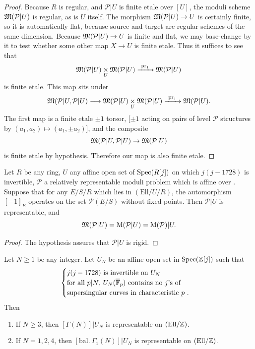 \begin{proof}
Because $R$ is regular, and $\mathcal{P}|U$ is finite etale over $[U]$, the moduli scheme $\mathfrak{M}(\mathcal{P}|U)$ is regular, as is $U$ itself. The morphism $\mathfrak{M}(\mathcal{P}|U) \to U$ is certainly finite, so it is automatically flat, because source and target are regular schemes of the same dimension. Because $\mathfrak{M}(\mathcal{P}|U) \to U$ is finite and flat, we may base-change by it to test whether some other map $X \to U$ is finite etale. Thus it suffices to see that
\[
\mathfrak{M}(\mathcal{P}|U) \underset{U}{\times} \mathfrak{M}(\mathcal{P}|U) \xrightarrow{\ \mathrm{pr}_1\ } \mathfrak{M}(\mathcal{P}|U)
\]
is finite etale. This map sits under
\[
\mathfrak{M}(\mathcal{P}|U, \mathcal{P}|U) \longrightarrow \mathfrak{M}(\mathcal{P}|U) \underset{U}{\times} \mathfrak{M}(\mathcal{P}|U) \xrightarrow{\ \mathrm{pr}_1\ } \mathfrak{M}(\mathcal{P}|U) .
\]
The first map is a finite etale $\pm 1$ torsor, [$\pm 1$ acting on pairs of level $\mathcal{P}$ structures by $(a_1, a_2) \mapsto (a_1, \pm a_2)$], and the composite
\[
\mathfrak{M}(\mathcal{P}|U, \mathcal{P}|U) \to \mathfrak{M}(\mathcal{P}|U)
\]
is finite etale by hypothesis. Therefore our map is also finite etale.
\end{proof}

\begin{kprop}\label{prop:8.4.6}
Let $R$ be any ring, $U$ any affine open set of $\operatorname{Spec}(R[j])$ on which $j(j-1728)$ is invertible, $\mathcal{P}$ a relatively representable moduli problem which is affine over \EllR. Suppose that for any $E/S/R$ which lies in $(\mathrm{Ell}/U/R)$, the automorphism $[-1]_E$ operates on the set $\mathcal{P}(E/S)$ without fixed points. Then $\mathcal{P}|U$ is representable, and
\[
\mathfrak{M}(\mathcal{P}|U) = \mathrm{M}(\mathcal{P}|U) = \mathrm{M}(\mathcal{P})|U .
\]
\end{kprop}

\begin{proof}
The hypothesis assures that $\mathcal{P}|U$ is rigid.
\end{proof}

\begin{kcor}\label{cor:8.4.7}
Let $N \ge 1$ be any integer. Let $U_N$ be an affine open set in $\operatorname{Spec}(\mathbb{Z}[j])$ such that
\[
\begin{cases}
\text{$j(j-1728)$ is invertible on $U_N$} \\
\text{for all $p|N$, $U_N(\overline{\mathbb{F}}_p)$ contains no $j$'s of} \\
\text{supersingular curves in characteristic $p$ .}
\end{cases}
\]
Then
\begin{enumerate}[(1)]
\item If $N \ge 3$, then $[\Gamma(N)]|U_N$ is representable on $(\mathrm{Ell}/\mathbb{Z})$.
\item If $N = 1,2,4$, then $[\mathrm{bal.}\ \Gamma_1(N)]|U_N$ is representable on $(\mathrm{Ell}/\mathbb{Z})$.
\end{enumerate}
\end{kcor}

